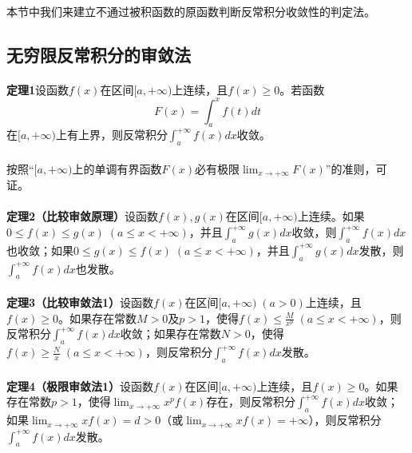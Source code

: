 \paragraph{}
本节中我们来建立不通过被积函数的原函数判断反常积分收敛性的判定法。

\subsection{无穷限反常积分的审敛法}
\paragraph{}
\textbf{定理1\;}设函数$f(x)$在区间$[a,+\infty)$上连续，且$f(x) \geq 0$。若函数
\begin{equation}
  F(x) = \int_a^xf(t)dt
\end{equation}
在$[a,+\infty)$上有上界，则反常积分$\displaystyle\int_a^{+\infty}f(x)dx$收敛。

\paragraph{}
按照“$[a,+\infty)$上的单调有界函数$F(x)$必有极限$\displaystyle\lim_{x \to +\infty}F(x)$”的准则，可证。

\paragraph{}
\textbf{定理2（比较审敛原理）\;}设函数$f(x), g(x)$在区间$[a,+\infty)$上连续。如果$0 \leq f(x) \leq g(x) \; (a \leq x < +\infty)$，并且$\displaystyle\int_a^{+\infty}g(x)dx$收敛，则$\displaystyle\int_a^{+\infty}f(x)dx$也收敛；如果$0\leq g(x) \leq f(x) \; (a \leq x < +\infty)$，并且$\displaystyle\int_a^{+\infty}g(x)dx$发散，则$\displaystyle\int_a^{+\infty}f(x)dx$也发散。

\paragraph{}
\textbf{定理3（比较审敛法1）\;}设函数$f(x)$在区间$[a,+\infty) \; (a>0)$上连续，且$f(x) \geq 0$。如果存在常数$M > 0$及$p > 1$，使得$\displaystyle f(x) \leq \frac{M}{x^p} \; (a \leq x < +\infty)$，则反常积分$\displaystyle\int_a^{+\infty}f(x)dx$收敛；如果存在常数$N > 0$，使得$\displaystyle f(x) \geq \frac{N}{x} \; (a \leq x < +\infty)$，则反常积分$\displaystyle\int_a^{+\infty}f(x)dx$发散。

\paragraph{}
\label{极限审敛法1}
\textbf{定理4（极限审敛法1）\;}设函数$f(x)$在区间$[a, +\infty)$上连续，且$f(x) \geq 0$。如果存在常数$p > 1$，使得$\displaystyle\lim_{x \to +\infty}x^pf(x)$存在，则反常积分$\displaystyle\int_a^{+\infty}f(x)dx$收敛；如果$\displaystyle\lim_{x \to +\infty}xf(x)=d > 0$（或$\displaystyle\lim_{x\to+\infty}xf(x) = +\infty$），则反常积分$\displaystyle\int_a^{+\infty}f(x)dx$发散。


